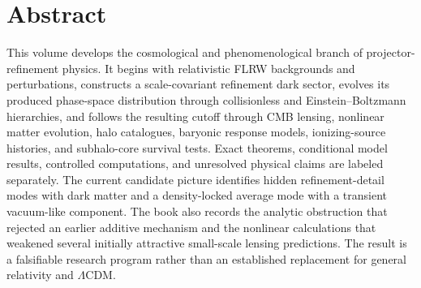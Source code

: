 \chapter*{Abstract}
This volume develops the cosmological and phenomenological branch of projector-refinement physics. It begins with relativistic FLRW backgrounds and perturbations, constructs a scale-covariant refinement dark sector, evolves its produced phase-space distribution through collisionless and Einstein--Boltzmann hierarchies, and follows the resulting cutoff through CMB lensing, nonlinear matter evolution, halo catalogues, baryonic response models, ionizing-source histories, and subhalo-core survival tests. Exact theorems, conditional model results, controlled computations, and unresolved physical claims are labeled separately. The current candidate picture identifies hidden refinement-detail modes with dark matter and a density-locked average mode with a transient vacuum-like component. The book also records the analytic obstruction that rejected an earlier additive mechanism and the nonlinear calculations that weakened several initially attractive small-scale lensing predictions. The result is a falsifiable research program rather than an established replacement for general relativity and $\Lambda$CDM.
